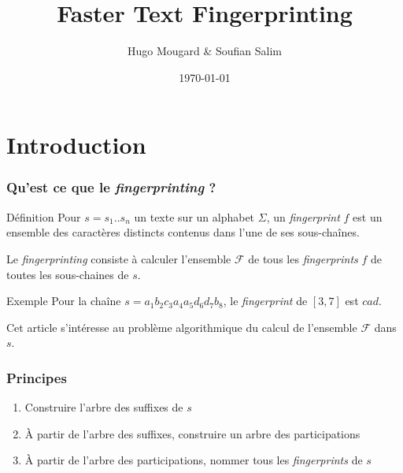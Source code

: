 \documentclass[10pt]{beamer}
\title{Faster Text Fingerprinting}
\author{Hugo Mougard \& Soufian Salim}
\date{\today}
\begin{document}
\begin{frame}
  	\maketitle
\end{frame}

\begin{frame}
	\tableofcontents
\end{frame}

\section{Introduction}

\begin{frame}
	\frametitle{Qu'est ce que le \textit{fingerprinting} ?}
	
	\begin{block}{Définition}
		Pour $s = s_{1} .. s_{n}$ un texte sur un alphabet $\Sigma$, un \textit{fingerprint} $f$ est un ensemble des caractères distincts contenus dans l'une de ses sous-chaînes. \newline
	
	Le \textit{fingerprinting} consiste à calculer l'ensemble $\mathcal{F}$ de tous les \textit{fingerprints} $f$ de toutes les sous-chaines de $s$. 
	\end{block}
	
	\begin{block}{Exemple}
		Pour la chaîne $s = a_{1} b_{2} c_{3} a_{4} a_{5} d_{6} d_{7} b_{8}$, le \textit{fingerprint} de $[3,7]$ est $cad$.
	\end{block}
	
	Cet article s'intéresse au problème algorithmique du calcul de l'ensemble $\mathcal{F}$ dans $s$.	
\end{frame}

\begin{frame}
	\frametitle{Principes}
	
	\begin{enumerate}
		\item Construire l'arbre des suffixes de $s$
		\item À partir de l'arbre des suffixes, construire un arbre des participations
		\item À partir de l'arbre des participations, nommer tous les \textit{fingerprints} de $s$
	\end{enumerate}

\end{frame}
\end{document}
